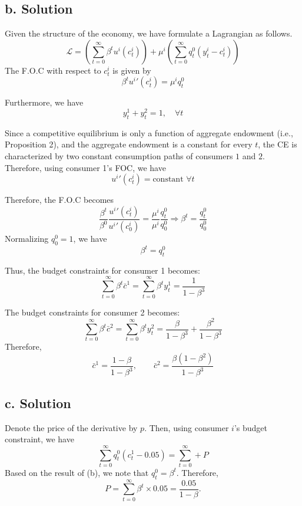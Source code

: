 \documentclass[11pt]{article}
\theoremstyle{definition}
\theoremstyle{boldtitle} %
\numberwithin{equation}{section}
\numberwithin{figure}{section}
\numberwithin{table}{section}
\begin{document}
\subsection{b. Solution}

Given the structure of the economy, we have formulate a Lagrangian as follows.
\[
\mathcal{L} = \left(\sum_{t=0}^{\infty} \beta^t u^i(c^i_t) \right) + \mu^i \left(\sum_{t=0}^\infty q^0_t (y^i_t - c^i_t) \right)
\]
The F.O.C with respect to $c^i_t$ is given by 
\[
\beta^t {u^i}'(c^i_t) = \mu^i q^0_t
\]


Furthermore, we have
\[
y_t^1 + y_t^2 = 1, \quad \forall t
\]

Since a competitive equilibrium is only a function of aggregate endowment (i.e., Proposition 2), 
and the aggregate endowment is a constant for every $t$, 
the CE is characterized by two constant consumption paths of consumers $1$ and $2$.
Therefore, using consumer 1's FOC, we have 
\[
{u^i}'(c^i_t) = \text{constant } \forall t
\]

Therefore, the F.O.C becomes
\[
\frac{\beta^t}{\beta^0} \frac{{u^i}'(c^i_t)}{{u^i}'(c^i_0)} = \frac{\mu^i}{\mu^i} \frac{q^0_t}{q^0_0}
\Rightarrow \beta^t = \frac{q^0_t}{q^0_0}
\]
Normalizing $q^0_0 =1$, we have 
\[
\beta^t = q^0_t
\]

Thus, the budget constraints for consumer 1 becomes:
\[
\sum_{t=0}^{\infty} \beta^t \bar{c}^1 = \sum_{t=0}^{\infty} \beta^t y_t^1 = \frac{1}{1 - \beta^3}
\]

The budget constraints for consumer 2 becomes:
\[
\sum_{t=0}^{\infty} \beta^t \bar{c}^2 = \sum_{t=0}^{\infty} \beta^t y_t^2 = \frac{\beta}{1 - \beta^3} + \frac{\beta^2}{1 - \beta^3}
\]
Therefore, 
\[
\bar{c}^1 = \frac{1 - \beta}{1 - \beta^3}, \qquad \bar{c}^2 = \frac{\beta(1 - \beta^2)}{1 - \beta^3} 
\]


\subsection{c. Solution}
Denote the price of the derivative by $p$. 
Then, using consumer $i$'s budget constraint, we have
\[
\sum_{t=0}^\infty q_t^0(c_t^1 - 0.05) = \sum_{t=0}^{\infty} + P
\]
Based on the result of (b), we note that $q_t^0 = \beta^t$.
Therefore, 
\[
P = \sum_{t=0}^\infty \beta^t \times 0.05 = \frac{0.05}{1 - \beta}.
\]


\end{document}
